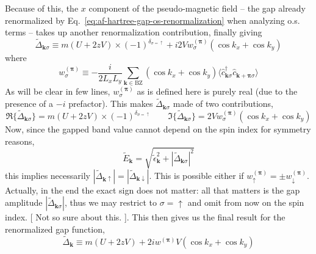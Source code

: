 Because of this, the $x$ component of the pseudo-magnetic field -- the gap already renormalized by Eq.~\eqref{eq:af-hartree-gap-os-renormalization} when analyzing o.s. terms -- takes up another renormalization contribution, finally giving
\begin{equation}\label{eq:af-fock-gap-ss-renormalization-intermediate}
	\tilde{\Delta}_{\mathbf{k}\sigma} \equiv m(U + 2zV) \times (-1)^{\delta_{\sigma=\uparrow}} + i2V w_\sigma^{(\bm{\pi})} \left(
		\cos k_x + \cos	k_y	
	\right)
\end{equation}
where
\[
	w_\sigma^{(\bm{\pi})} \equiv -\frac{i}{2L_xL_y} \sum_{\mathbf{k}\in\mathrm{BZ}}
	\left(
		\cos k_x + \cos k_y
	\right) \langle
		\hat c_{\mathbf{k}\sigma}^\dagger  \hat c_{\mathbf{k}+\bm{\pi}\sigma}
	\rangle
\]
As will be clear in few lines, $w_\sigma^{(\bm{\pi})}$ as is defined here is purely real (due to the presence of a $-i$ prefactor). This makes $\tilde{\Delta}_{\mathbf{k}\sigma}$ made of two contributions,
\[
	\Re\{\tilde{\Delta}_{\mathbf{k}\sigma}\} = m(U + 2zV) \times (-1)^{\delta_{\sigma=\uparrow}}
	\qquad
	\Im\{\tilde{\Delta}_{\mathbf{k}\sigma}\} = 2V w_\sigma^{(\bm{\pi})} \left(
	\cos k_x + \cos	k_y	
	\right)
\]
Now, since the gapped band value cannot depend on the spin index for symmetry reasons,
\[
	\tilde{E}_\mathbf{k} = \sqrt{
		\tilde{\epsilon}_\mathbf{k}^2 + |\tilde{\Delta}_{\mathbf{k}\sigma}|^2
	}
\]
this implies necessarily $|\tilde{\Delta}_{\mathbf{k}\uparrow}| = |\tilde{\Delta}_{\mathbf{k}\downarrow}|$. This is possible either if $w_\uparrow^{(\bm{\pi})} = \pm w_\downarrow^{(\bm{\pi})}$. Actually, in the end the exact sign does not matter: all that matters is the gap amplitude $|\tilde{\Delta}_{\mathbf{k}\sigma}|$, thus we may restrict to $\sigma=\uparrow$ and omit from now on the spin index. {\color{tabred}[
	Not so sure about this.	
]}. This then gives us the final result for the renormalized gap function,
\begin{equation}\label{eq:af-fock-gap-ss-renormalization}
	\tilde{\Delta}_\mathbf{k} \equiv
		m(U + 2zV) + 2iw^{(\bm{\pi})}V
	\left(
		\cos k_x + \cos	k_y	
	\right)
\end{equation}
